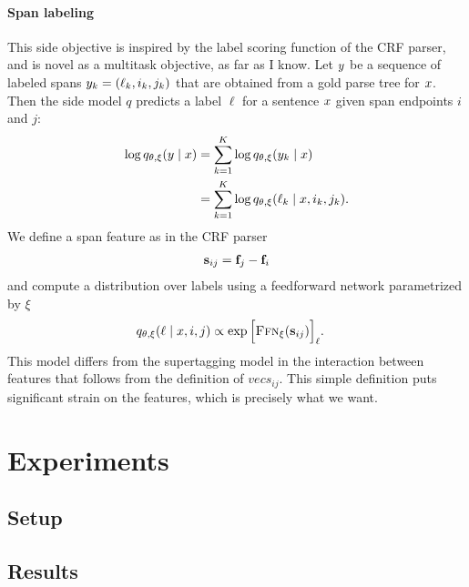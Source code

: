 \paragraph{Span labeling}
This side objective is inspired by the label scoring function of the CRF parser, and is novel as a multitask objective, as far as I know. Let $y$ be a sequence of labeled spans $y_k = (\ell_k, i_k, j_k)$ that are obtained from a gold parse tree for $x$. Then the side model $q$ predicts a label $\ell$ for a sentence $x$ given span endpoints $i$ and $j$:
\begin{align*}
  \log q_{\theta, \xi}(y \mid x)
    &= \sum_{k=1}^K \log q_{\theta, \xi}( y_k \mid x)  \\
    &= \sum_{k=1}^K \log q_{\theta, \xi}( \ell_k \mid x, i_k, j_k).
\end{align*}
We define a span feature as in the CRF parser
\begin{align*}
  \mathbf{s}_{ij} = \mathbf{f}_j - \mathbf{f}_i
\end{align*}
and compute a distribution over labels using a feedforward network parametrized by $\xi$
\begin{align*}
  q_{\theta, \xi}( \ell \mid x, i, j) &\propto \exp \Big[ \textsc{Ffn}_{\xi}( \mathbf{s}_{ij} ) \Big]_{\ell}.
\end{align*}
This model differs from the supertagging model in the interaction between features that follows from the definition of $vecs_{ij}$. This simple definition puts significant strain on the features, which is precisely what we want.



\section{Experiments}

\subsection{Setup}

\subsection{Results}
